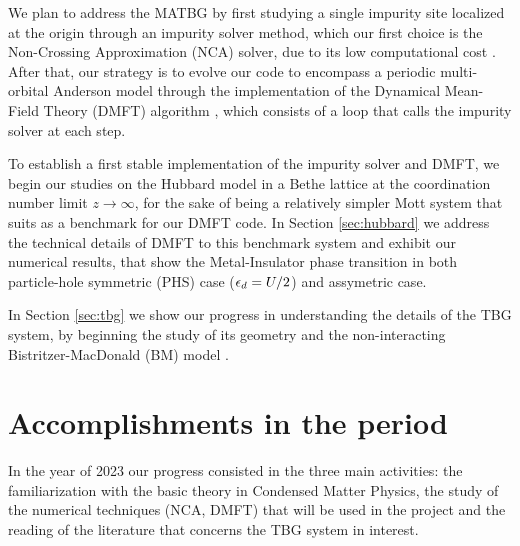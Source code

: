 \documentclass[12pt]{report}
\begin{document}
We plan to address the MATBG by first studying a single impurity site localized at the origin through an impurity solver method, which our first choice is the Non-Crossing Approximation (NCA) solver, due to its low computational cost \cite{impurity-solvers}. After that, our strategy is to evolve our code to encompass a periodic multi-orbital Anderson model through the implementation of the Dynamical Mean-Field Theory (DMFT) algorithm \cite{georges1996}, which consists of a loop that calls the impurity solver at each step.

To establish a first stable implementation of the impurity solver and DMFT, we begin our studies on the Hubbard model in a Bethe lattice at the coordination number limit $z\to\infty$, for the sake of being a relatively simpler Mott system that suits as a benchmark for our DMFT code. In Section \ref{sec:hubbard} we address the technical details of DMFT to this benchmark system and exhibit our numerical results, that show the Metal-Insulator phase transition in both particle-hole symmetric (PHS) case ($\epsilon_d = U/2$) and assymetric case.

In Section \ref{sec:tbg} we show our progress in understanding the details of the TBG system, by beginning the study of its geometry \cite{handbook2019} and the non-interacting Bistritzer-MacDonald (BM) model \cite{macdonald2011}.

\chapter{Accomplishments in the period} \label{chp:accomplishments}

In the year of 2023 our progress consisted in the three main activities: the familiarization with the basic theory in Condensed Matter Physics, the study of the numerical techniques (NCA, DMFT) that will be used in the project and the reading of the literature that concerns the TBG system in interest.
\end{document}
